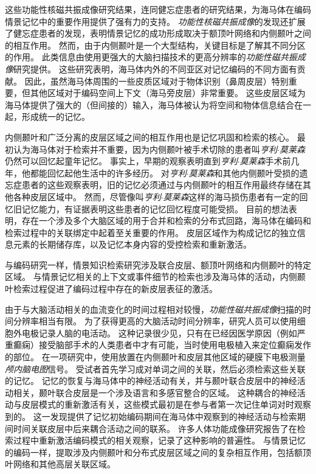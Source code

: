 这些功能性核磁共振成像研究结果，连同健忘症患者的研究结果，为海马体在编码情景记忆中的重要作用提供了强有力的支持。
\textit{功能性核磁共振成像}的发现还扩展了健忘症患者的发现，表明情景记忆的成功形成取决于额顶叶网络和内侧颞叶之间的相互作用。
然而，由于内侧颞叶是一个大型结构，关键目标是了解其不同分区的作用。
此类信息由使用更强大的大脑扫描技术的更高分辨率的\textit{功能性磁共振成像}研究提供。
这些研究表明，海马体内外的不同亚区对记忆编码的不同方面有贡献。
因此，虽然海马体周围的一些皮质区域对于物体识别（鼻周皮层）特别重要，但其他区域对于编码空间上下文（海马旁皮层）非常重要。
这些皮层区域为海马体提供了强大的（但间接的）输入，海马体被认为将空间和物体信息结合在一起，形成统一的记忆。


内侧颞叶和广泛分离的皮层区域之间的相互作用也是记忆巩固和检索的核心。
最初认为海马体对于检索并不重要，因为内侧颞叶被手术切除的患者叫\textit{亨利$\cdot$莫莱森}仍然可以回忆起童年记忆。
事实上，早期的观察表明直到\textit{亨利$\cdot$莫莱森}手术前几年，他都能回忆起他生活中的许多经历。
对\textit{亨利$\cdot$莫莱森}和其他内侧颞叶受损的遗忘症患者的这些观察表明，旧的记忆必须通过与内侧颞叶的相互作用最终存储在其他各种皮层区域中。
然而，尽管像叫\textit{亨利$\cdot$莫莱森}这样的海马损伤患者有一定的回忆旧记忆能力，有证据表明这些患者的记忆回忆程度可能受损。
目前的想法表明，存在一个涉及多个大脑区域的用于合并和检索的分布式回路，海马体在编码和检索过程中的关联绑定中起着至关重要的作用。
皮层区域作为构成记忆的独立信息元素的长期储存库，以及记忆本身内容的受控检索和重新激活。


与编码研究一样，情景知识检索研究涉及联合皮层、额顶叶网络和内侧颞叶的特定区域。
与情景记忆相关的上下文或事件细节的检索也涉及海马体的活动，内侧颞叶检索过程促进了编码过程中存在的新皮层表征的激活。


由于与大脑活动相关的血流变化的时间过程相对较慢，\textit{功能性磁共振成像}扫描的时间分辨率相当有限。
为了获得更高的大脑活动时间分辨率，研究人员可以使用细胞外电极记录人脑的电活动。
这种记录很少见，只有在已经因医学原因（例如严重癫痫）接受脑部手术的人类患者中才有可能，当时使用电极植入来定位癫痫发作的部位。
在一项研究中，使用放置在内侧颞叶和皮层其他区域的硬膜下电极测量\textit{颅内脑电图}信号。
受试者首先学习成对单词之间的关联，然后必须检索这些关联的记忆。
记忆的恢复与海马体中的神经活动有关，并与颞叶联合皮层中的神经活动相关，颞叶联合皮层是一个涉及语言和多感官整合的区域。
这种耦合的神经活动与皮层模式的重新激活有关，这些模式最初是在参与者第一次记住单词对时观察到的。
这一发现提供了记忆初始编码期间在海马体中观察到的神经活动与检索期间时间关联皮层中后来耦合活动之间的联系。
许多人体功能成像研究报告了在检索过程中重新激活编码模式的相关观察，记录了这种影响的普遍性。
与情景记忆的编码一样，提取涉及内侧颞叶和分布式皮层区域之间的复杂相互作用，包括额顶叶网络和其他高层关联区域。



